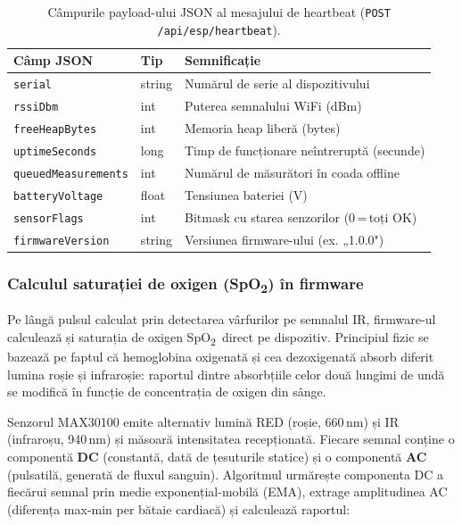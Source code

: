 \documentclass[12pt,a4paper,twoside]{article}
\newcommand{\spo}{SpO\textsubscript{2}}
\begin{document}
\begin{table}[H]
\centering
\small
\renewcommand{\arraystretch}{1.3}
\begin{tabular}{|l|l|p{6.8cm}|}
\hline
\textbf{Câmp JSON} & \textbf{Tip} & \textbf{Semnificație} \\
\hline
\texttt{serial}              & string & Numărul de serie al dispozitivului \\
\texttt{rssiDbm}             & int    & Puterea semnalului WiFi (dBm) \\
\texttt{freeHeapBytes}       & int    & Memoria heap liberă (bytes) \\
\texttt{uptimeSeconds}       & long   & Timp de funcționare neîntreruptă (secunde) \\
\texttt{queuedMeasurements}  & int    & Numărul de măsurători în coada offline \\
\texttt{batteryVoltage}      & float  & Tensiunea bateriei (V) \\
\texttt{sensorFlags}         & int    & Bitmask cu starea senzorilor (0\,=\,toți OK) \\
\texttt{firmwareVersion}     & string & Versiunea firmware-ului (ex. „1.0.0") \\
\hline
\end{tabular}
\caption{Câmpurile payload-ului JSON al mesajului de heartbeat (\texttt{POST /api/esp/heartbeat}).}
\label{tab:esp-heartbeat}
\end{table}

\subsubsection{Calculul saturației de oxigen (\texorpdfstring{\spo}{SpO2}) în firmware}

Pe lângă pulsul calculat prin detectarea vârfurilor pe semnalul IR, firmware-ul calculează și saturația de oxigen \spo\ direct pe dispozitiv. Principiul fizic se bazează pe faptul că hemoglobina oxigenată și cea dezoxigenată absorb diferit lumina roșie și infraroșie: raportul dintre absorbțiile celor două lungimi de undă se modifică în funcție de concentrația de oxigen din sânge.

Senzorul MAX30100 emite alternativ lumină RED (roșie, 660\,nm) și IR (infraroșu, 940\,nm) și măsoară intensitatea recepționată. Fiecare semnal conține o componentă \textbf{DC} (constantă, dată de țesuturile statice) și o componentă \textbf{AC} (pulsatilă, generată de fluxul sanguin). Algoritmul urmărește componenta DC a fiecărui semnal prin medie exponențial-mobilă (EMA), extrage amplitudinea AC (diferența max-min per bătaie cardiacă) și calculează raportul:
\end{document}
